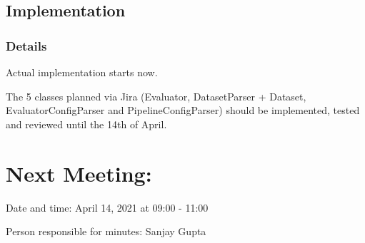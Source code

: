 \documentclass[11pt]{meetingmins} %
\begin{document}
\subsection{Implementation}
\subsubsection{Details}
\begin{hiddensubitems}
	\item Actual implementation starts now.
	\item The 5 classes planned via Jira (Evaluator, DatasetParser + Dataset, EvaluatorConfigParser and PipelineConfigParser) should be implemented, tested and reviewed until the 14th of April.
\end{hiddensubitems}

\section{Next Meeting:}
\begin{hiddensubitems}
    \item Date and time: April 14, 2021 at 09:00 - 11:00
    \item Person responsible for minutes: Sanjay Gupta
\end{hiddensubitems}
\end{document}
